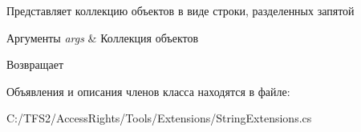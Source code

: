 Представляет коллекцию объектов в виде строки, разделенных запятой 


\begin{DoxyParams}{Аргументы}
{\em args} & Коллекция объектов\\
\hline
\end{DoxyParams}
\begin{DoxyReturn}{Возвращает}

\end{DoxyReturn}


Объявления и описания членов класса находятся в файле\+:\begin{DoxyCompactItemize}
\item 
C\+:/\+T\+F\+S2/\+Access\+Rights/\+Tools/\+Extensions/String\+Extensions.\+cs\end{DoxyCompactItemize}
